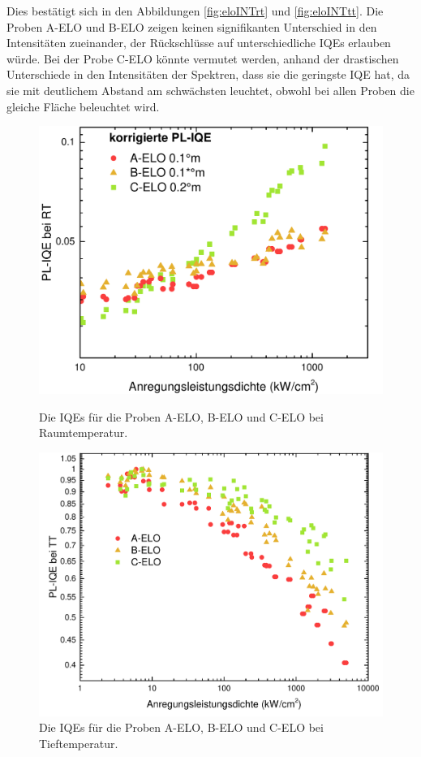 \noindent 
% 
Dies bestätigt sich in den Abbildungen \ref{fig:eloINTrt} und \ref{fig:eloINTtt}. Die Proben A-ELO und B-ELO zeigen keinen signifikanten Unterschied in den Intensitäten zueinander, der Rückschlüsse auf unterschiedliche IQEs erlauben würde. Bei der Probe C-ELO könnte vermutet werden, anhand der drastischen Unterschiede in den Intensitäten der Spektren, dass sie die geringste IQE hat, da sie mit deutlichem Abstand am schwächsten leuchtet, obwohl bei allen Proben die gleiche Fläche beleuchtet wird. 
%
\begin{figure}[H]
  \centering
  \begin{minipage}[t]{0.49\textwidth}
    \centering
    \includegraphics[width=\textwidth]{Bilder/TS4045/corrIQERT.pdf}
		\caption{Die IQEs für die Proben A-ELO, B-ELO und C-ELO bei Raumtemperatur.}
    \label{fig:eloiqeRT}
  \end{minipage}
	\hfill
  \begin{minipage}[t]{0.49\textwidth}
    \centering
    \includegraphics[width=\linewidth]{Bilder/TS4045/IQETT.pdf}
		\caption{Die IQEs für die Proben A-ELO, B-ELO und C-ELO bei Tieftemperatur.}
    \label{fig:elocorriqeRT}
  \end{minipage}
\end{figure}
